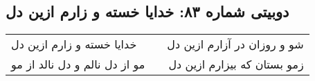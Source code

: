 \begin{center}
\section*{دوبیتی شماره ۸۳: خدایا خسته و زارم ازین دل}
\label{sec:083}
\begin{longtable}{l p{0.5cm} r}
خدایا خسته و زارم ازین دل
&&
شو و روزان در آزارم ازین دل
\\
مو از دل نالم و دل نالد از مو
&&
زمو بستان که بیزارم ازین دل
\\
\end{longtable}
\end{center}

